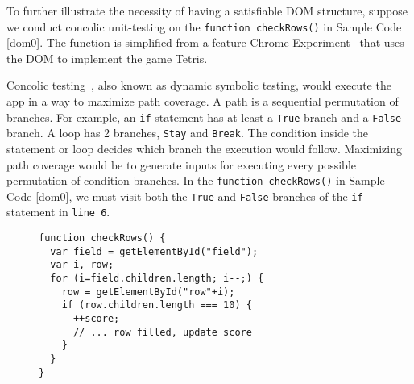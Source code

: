 To further illustrate the necessity of having a satisfiable DOM structure, suppose we conduct concolic unit-testing on the {\tt function checkRows()} in Sample Code \ref{dom0}.  
The function is simplified from a feature Chrome Experiment~\cite{domtris} that uses the DOM to implement the game Tetris.  

Concolic testing~\cite{cute}, also known as dynamic symbolic testing, would execute the app in a way to maximize path coverage.
A path is a sequential permutation of branches.  For example, an {\tt if} statement has at least a {\tt True} branch and a {\tt False} branch.  
A loop has 2 branches, {\tt Stay} and {\tt Break}.  The condition inside the statement or loop decides which branch the execution would follow.  
Maximizing path coverage would be to generate inputs for executing every possible permutation of condition branches.  
In the {\tt function checkRows()} in Sample Code \ref{dom0}, we must visit both the {\tt True} and {\tt False} branches of the {\tt if} statement in {\tt line 6}.
\begin{figure}
\begin{lstlisting}[caption=Example code whose tests and execution depend on the Document Object Model having a precise tree structure. {\tt getElementById()} is equivalent to {\tt document.getElementById()}.,label=dom0]
function checkRows() {
  var field = getElementById("field"); 
  var i, row;
  for (i=field.children.length; i--;) {
    row = getElementById("row"+i);
    if (row.children.length === 10) {
      ++score;
      // ... row filled, update score
    }
  }
}
\end{lstlisting}
\end{figure}

